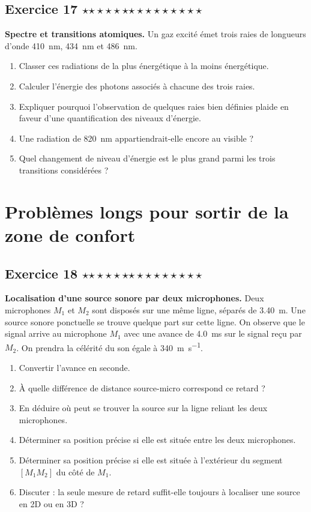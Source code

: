 \documentclass[11pt,a4paper]{article}
\newcommand{\etoiles}[1]{%
\ifcase#1\or $\star$\or $\star\star$\or $\star\star\star$\or $\star\star\star\star$\or $\star\star\star\star\star$\fi}
\newcommand{\exostar}[2]{\subsection*{Exercice #1 \hfill \etoiles{#2}}}
\begin{document}
\exostar{17}{4}
\textbf{Spectre et transitions atomiques.} Un gaz excité émet trois raies de longueurs d'onde \SI{410}{nm}, \SI{434}{nm} et \SI{486}{nm}.
\begin{enumerate}[label=\alph*)]
    \item Classer ces radiations de la plus énergétique à la moins énergétique.
    \item Calculer l'énergie des photons associés à chacune des trois raies.
    \item Expliquer pourquoi l'observation de quelques raies bien définies plaide en faveur d'une quantification des niveaux d'énergie.
    \item Une radiation de \SI{820}{nm} appartiendrait-elle encore au visible ?
    \item Quel changement de niveau d'énergie est le plus grand parmi les trois transitions considérées ?
\end{enumerate}

\section{Problèmes longs pour sortir de la zone de confort}

\exostar{18}{4}
\textbf{Localisation d'une source sonore par deux microphones.}
Deux microphones $M_1$ et $M_2$ sont disposés sur une même ligne, séparés de \SI{3,40}{m}. Une source sonore ponctuelle se trouve quelque part sur cette ligne. On observe que le signal arrive au microphone $M_1$ avec une avance de \SI{4,0}{ms} sur le signal reçu par $M_2$. On prendra la célérité du son égale à \SI{340}{m.s^{-1}}.
\begin{enumerate}[label=\alph*)]
    \item Convertir l'avance en seconde.
    \item À quelle différence de distance source-micro correspond ce retard ?
    \item En déduire où peut se trouver la source sur la ligne reliant les deux microphones.
    \item Déterminer sa position précise si elle est située entre les deux microphones.
    \item Déterminer sa position précise si elle est située à l'extérieur du segment $[M_1M_2]$ du côté de $M_1$.
    \item Discuter : la seule mesure de retard suffit-elle toujours à localiser une source en 2D ou en 3D ?
\end{enumerate}
\end{document}
